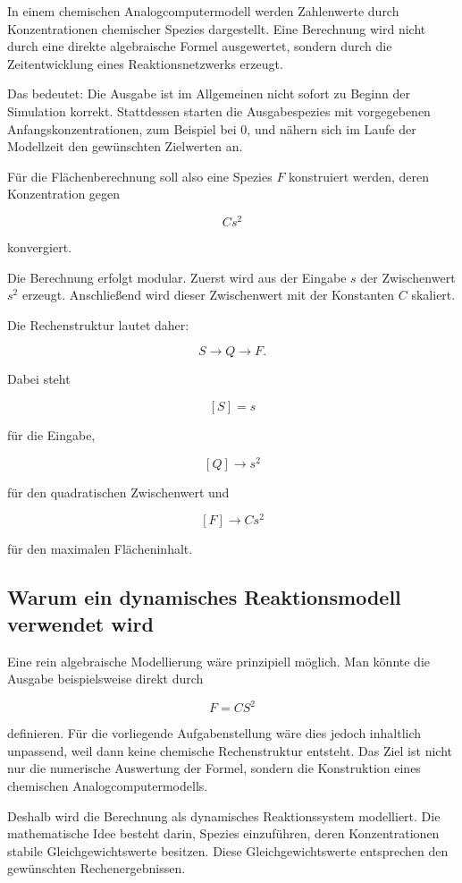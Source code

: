In einem chemischen Analogcomputermodell werden Zahlenwerte durch
Konzentrationen chemischer Spezies dargestellt. Eine Berechnung wird nicht
durch eine direkte algebraische Formel ausgewertet, sondern durch die
Zeitentwicklung eines Reaktionsnetzwerks erzeugt.

Das bedeutet: Die Ausgabe ist im Allgemeinen nicht sofort zu Beginn der
Simulation korrekt. Stattdessen starten die Ausgabespezies mit
vorgegebenen Anfangskonzentrationen, zum Beispiel bei \(0\), und nähern
sich im Laufe der Modellzeit den gewünschten Zielwerten an.

Für die Flächenberechnung soll also eine Spezies \(F\) konstruiert werden,
deren Konzentration gegen

\[
C s^2
\]

konvergiert.

Die Berechnung erfolgt modular. Zuerst wird aus der Eingabe \(s\) der
Zwischenwert \(s^2\) erzeugt. Anschließend wird dieser Zwischenwert mit
der Konstanten \(C\) skaliert.

Die Rechenstruktur lautet daher:

\[
S
\longrightarrow
Q
\longrightarrow
F.
\]

Dabei steht

\[
[S]=s
\]

für die Eingabe,

\[
[Q]\longrightarrow s^2
\]

für den quadratischen Zwischenwert und

\[
[F]\longrightarrow C s^2
\]

für den maximalen Flächeninhalt.

\subsection{Warum ein dynamisches Reaktionsmodell verwendet wird}

Eine rein algebraische Modellierung wäre prinzipiell möglich. Man könnte
die Ausgabe beispielsweise direkt durch

\[
F = C S^2
\]

definieren. Für die vorliegende Aufgabenstellung wäre dies jedoch
inhaltlich unpassend, weil dann keine chemische Rechenstruktur entsteht.
Das Ziel ist nicht nur die numerische Auswertung der Formel, sondern die
Konstruktion eines chemischen Analogcomputermodells.

Deshalb wird die Berechnung als dynamisches Reaktionssystem modelliert.
Die mathematische Idee besteht darin, Spezies einzuführen, deren
Konzentrationen stabile Gleichgewichtswerte besitzen. Diese
Gleichgewichtswerte entsprechen den gewünschten Rechenergebnissen.

